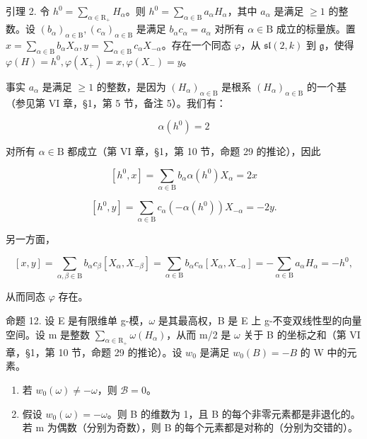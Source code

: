 引理 2. 令 \(h^0 = \sum_{\alpha \in \mathrm{R}_{+}} H_\alpha\)。则 \(h^0 = \sum_{\alpha \in \mathrm{B}} a_\alpha H_\alpha\)，其中 \(a_\alpha\) 是满足 \(\geq 1\) 的整数。设 \((b_\alpha)_{\alpha \in \mathrm{B}}, (c_\alpha)_{\alpha \in \mathrm{B}}\) 是满足 \(b_\alpha c_\alpha = a_\alpha\) 对所有 \(\alpha \in \mathrm{B}\) 成立的标量族。置 \(x = \sum_{\alpha \in \mathrm{B}} b_\alpha X_\alpha, y = \sum_{\alpha \in \mathrm{B}} c_\alpha X_{-\alpha}\)。存在一个同态 \(\varphi\)，从 \(\mathfrak{sl}(2,k)\) 到 \(\mathfrak{g}\)，使得 \(\varphi(H) = h^0, \varphi(X_+) = x, \varphi(X_-) = y\)。

事实 \(a_{\alpha}\) 是满足 \(\geq 1\) 的整数，是因为 \((H_{\alpha})_{\alpha \in \mathrm{B}}\) 是根系 \((H_{\alpha})_{\alpha \in \mathrm{B}}\) 的一个基（参见第 VI 章，§1，第 5 节，备注 5）。我们有：

\[
\alpha (h ^ {0}) = 2\tag{1}
\]

对所有 \(\alpha \in \mathrm{B}\) 都成立（第 VI 章，§1，第 10 节，命题 29 的推论），因此

\[
[ h ^ {0}, x ] = \sum_ {\alpha \in \mathrm{B}} b _ {\alpha} \alpha (h ^ {0}) X _ {\alpha} = 2 x\tag{2}
\]

\[
[ h ^ {0}, y ] = \sum_ {\alpha \in \mathrm{B}} c _ {\alpha} (- \alpha (h ^ {0})) X _ {- \alpha} = - 2 y.\tag{3}
\]

另一方面，

\[
[ x, y ] = \sum_ {\alpha , \beta \in \mathrm{B}} b _ {\alpha} c _ {\beta} [ X _ {\alpha}, X _ {- \beta} ] = \sum_ {\alpha \in \mathrm{B}} b _ {\alpha} c _ {\alpha} [ X _ {\alpha}, X _ {- \alpha} ] = - \sum_ {\alpha \in \mathrm{B}} a _ {\alpha} H _ {\alpha} = - h ^ {0},\tag{4}
\]

从而同态 \(\varphi\) 存在。

命题 12. 设 E 是有限维单 g-模，\(\omega\) 是其最高权，B 是 E 上 g-不变双线性型的向量空间。设 m 是整数 \(\sum_{\alpha\in\mathrm{R}_{+}}\omega(H_{\alpha})\)，从而 m/2 是 \(\omega\) 关于 B 的坐标之和（第 VI 章，§1，第 10 节，命题 29 的推论）。设 \(w_{0}\) 是满足 \(w_{0}(B) = -B\) 的 W 中的元素。

\begin{enumerate}
\def\labelenumi{(\roman{enumi})}
\item
  若 \(w_0(\omega) \neq -\omega\)，则 \(\mathcal{B} = 0\)。
\item
  假设 \(w_{0}(\omega) = -\omega\)。则 B 的维数为 1，且 B 的每个非零元素都是非退化的。若 m 为偶数（分别为奇数），则 B 的每个元素都是对称的（分别为交错的）。
\end{enumerate}

